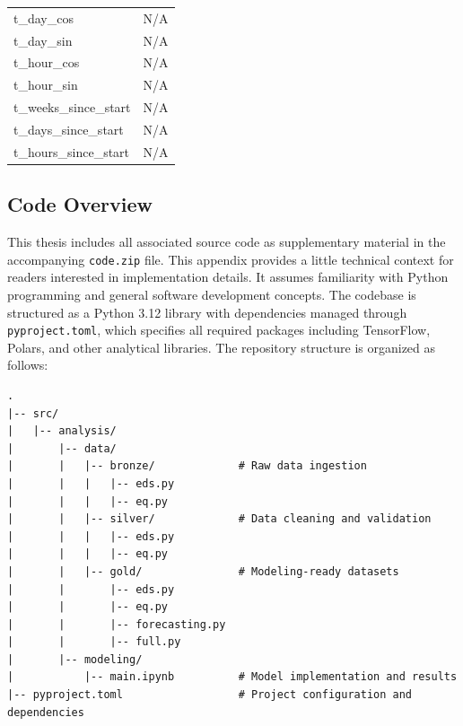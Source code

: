 \begin{xltabular}{\textwidth}{lX}
    t\_day\_cos                                          & N/A                                                                      \\
    t\_day\_sin                                          & N/A                                                                      \\
    t\_hour\_cos                                         & N/A                                                                      \\
    t\_hour\_sin                                         & N/A                                                                      \\
    t\_weeks\_since\_start                               & N/A                                                                      \\
    t\_days\_since\_start                                & N/A                                                                      \\
    t\_hours\_since\_start                               & N/A                                                                      \\ 
\end{xltabular}

\clearpage

\thispagestyle{plain}
\subsection{Code Overview}
\label{apdx:code-overview}

This thesis includes all associated source code as supplementary material in the accompanying \texttt{code.zip} file. This appendix provides a little technical context for readers interested in implementation details. It assumes familiarity with Python programming and general software development concepts. The codebase is structured as a Python 3.12 library with dependencies managed through \texttt{pyproject.toml}, which specifies all required packages including TensorFlow, Polars, and other analytical libraries. The repository structure is organized as follows:

\begin{verbatim}
.
|-- src/
|   |-- analysis/
|       |-- data/
|       |   |-- bronze/             # Raw data ingestion
|       |   |   |-- eds.py
|       |   |   |-- eq.py
|       |   |-- silver/             # Data cleaning and validation
|       |   |   |-- eds.py
|       |   |   |-- eq.py
|       |   |-- gold/               # Modeling-ready datasets
|       |       |-- eds.py
|       |       |-- eq.py
|       |       |-- forecasting.py
|       |       |-- full.py
|       |-- modeling/
|           |-- main.ipynb          # Model implementation and results
|-- pyproject.toml                  # Project configuration and dependencies
\end{verbatim}
\vspace{0.2cm}

